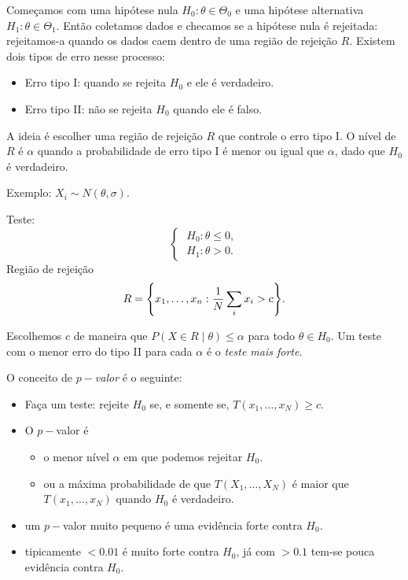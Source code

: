 \documentclass[a4paper,fleqn,12pt]{article}
\begin{document}
Começamos com uma hipótese nula $H_0: \theta \in \Theta_0$ e uma hipótese alternativa $H_1: \theta \in \Theta_1$. Então coletamos dados e checamos se a hipótese nula é rejeitada: rejeitamos-a quando os dados caem dentro de uma região de rejeição $R$. Existem dois tipos de erro nesse processo:
\begin{itemize}
\item Erro tipo I: quando se rejeita $H_0$ e ele é verdadeiro.
\item Erro tipo II: não se rejeita $H_0$ quando ele é falso.
\end{itemize}

 A ideia é escolher uma região de rejeição $R$ que controle o erro tipo I. O nível de $R$ é $\alpha$ quando a probabilidade de erro tipo I é menor ou igual que $\alpha$, dado que $H_0$ é verdadeiro.

Exemplo: $X_i \sim N(\theta, \sigma)$.

Teste:
$$
\begin{cases}
\; H_0: \theta \leq 0, \\
\; H_1: \theta > 0.
\end{cases}
$$
Região de rejeição
$$
R = \qty{x_1, \ldots, x_n: \frac{1}{N} \sum_i x_i > c}.
$$

Escolhemos $c$ de maneira que $P(X \in R \mid \theta) \leq \alpha$ para todo $\theta \in H_0$. Um teste com o menor erro do tipo II para cada $\alpha$ é o \textit{teste mais forte}.

\n

O conceito de $p-$\textit{valor} é o seguinte:
\begin{itemize}
\item Faça um teste: rejeite $H_0$ se, e somente se, $T(x_1, \ldots, x_N) \geq c$.
\item O $p-$valor é
\begin{itemize}
\item o menor nível $\alpha$ em que podemos rejeitar $H_0$.
\item ou a máxima probabilidade de que $T(X_1, \ldots, X_N)$ é maior que $T(x_1, \ldots, x_N)$ quando $H_0$ é verdadeiro.
\end{itemize}
\item um $p-$valor muito pequeno é uma evidência forte contra $H_0$.
\item tipicamente $<0.01$ é muito forte contra $H_0$, já com $>0.1$ tem-se pouca evidência contra $H_0$.
\end{itemize}

\n
\end{document}
